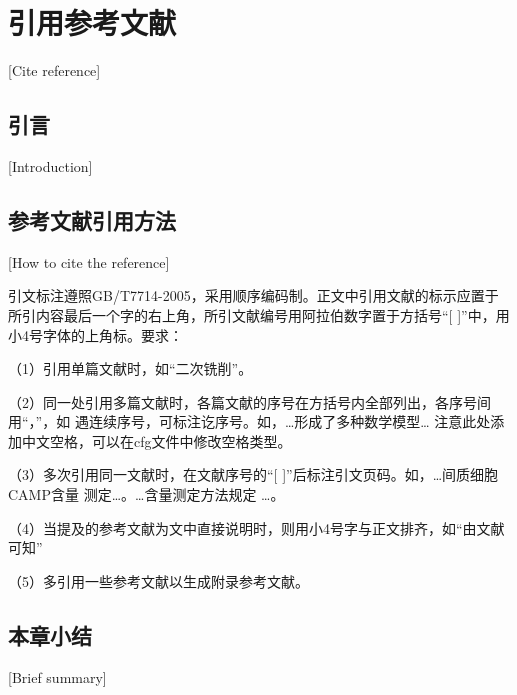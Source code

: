 
\chapter{引用参考文献}[Cite reference]

\section{引言}[Introduction]

\lipsum[1]

\section{参考文献引用方法}[How to cite the reference]

引文标注遵照GB/T7714-2005，采用顺序编码制。正文中引用文献的标示应置于所引内容最后一个字的右上角，所引文献编号用阿拉伯数字置于方括号“[ ]”中，用小4号字体的上角标。要求：

（1）引用单篇文献时，如“二次铣削\cite{ren2010}”。

（2）同一处引用多篇文献时，各篇文献的序号在方括号内全部列出，各序号间用“，”，如
遇连续序号，可标注讫序号。如，…形成了多种数学模型\cite{Gravagne2003,ren2010}…
注意此处添加中文空格，可以在cfg文件中修改空格类型。

（3）多次引用同一文献时，在文献序号的“[ ]”后标注引文页码。如，…间质细胞CAMP含量
测定\cite[100-197]{Gravagne2003}…。…含量测定方法规定
\cite[92]{Gravagne2003}…。

（4）当提及的参考文献为文中直接说明时，则用小4号字与正文排齐，如“由文献可知”

（5）多\cite{liu2016}引\cite{fu2018}用\cite{zhai2015}一\cite{yao2015}些\cite{jones2006}参\cite{mcmahan2005}考\cite{jones2004}文献以生成附录参考文献。

\section{本章小结}[Brief summary]

\lipsum[1]
